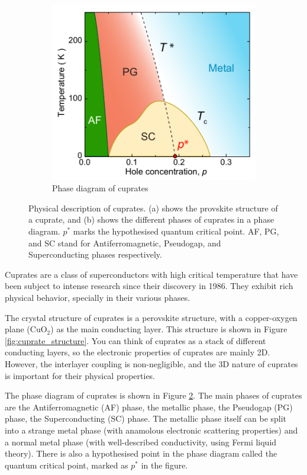 \begin{figure}
\begin{subfigure}{0.5\textwidth}
        \includegraphics[width=\textwidth]{figures/phase_diagram}
        \caption{Phase diagram of cuprates}
        \label{fig:phase_diagram}
    \end{subfigure}
    \caption{Physical description of cuprates. (a) shows the provskite structure of a cuprate,
    and (b) shows the different phases of cuprates in a phase diagram. $p^*$ marks the hypothesised
    quantum critical point. AF, PG, and SC stand for Antiferromagnetic, Pseudogap, and
    Superconducting phases respectively.}
\end{figure}

Cuprates are a class of superconductors with high critical temperature that have been subject
to intense research since their discovery in 1986. They exhibit rich physical behavior, specially
in their various phases.

The crystal structure of cuprates is a perovskite structure, with a copper-oxygen plane
($\mathrm{CuO}_2$) as the main conducting layer. This structure is shown in Figure
\ref{fig:cuprate_structure}. You can think of cuprates as a stack of different conducting layers,
so the electronic properties of cuprates are mainly 2D. However, the interlayer coupling is
non-negligible, and the 3D nature of cuprates is important for their physical properties.

The phase diagram of cuprates is shown in Figure \ref{fig:phase_diagram}. The main phases of
cuprates are the Antiferromagnetic (AF) phase, the metallic phase, the Pseudogap (PG) phase,
the Superconducting (SC) phase. The metallic phase itself can be split into a strange metal
phase (with anamolous electronic scattering properties) and a normal metal phase (with
well-described conductivity, using Fermi liquid theory). There is also a hypothesised point in the
phase diagram called the quantum critical point, marked as $p^*$ in the figure.
